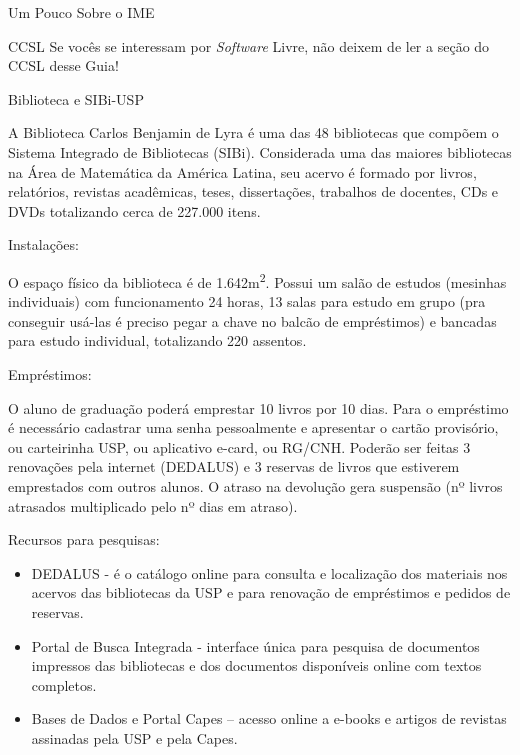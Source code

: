 \begin{secao}{Um Pouco Sobre o IME}
\begin{subsecao}{CCSL}
Se vocês se interessam por \textit{Software} Livre, não deixem de ler a seção
do CCSL desse Guia!

\end{subsecao}

\begin{subsecao}{Biblioteca e SIBi-USP}

A Biblioteca Carlos Benjamin de Lyra é uma das 48 bibliotecas que compõem o Sistema Integrado de Bibliotecas (SIBi). Considerada uma das maiores bibliotecas na Área de Matemática da América Latina, seu acervo é formado por livros, relatórios, revistas acadêmicas, teses, dissertações, trabalhos de docentes, CDs e DVDs totalizando cerca de 227.000 itens. 

\begin{subsubsecao}{Instalações:}

O espaço físico da biblioteca é de 1.642m\textsuperscript{2}. Possui um salão de estudos (mesinhas individuais) com funcionamento 24 horas, 13 salas para estudo em grupo (pra conseguir usá-las é preciso pegar a chave no balcão de empréstimos) e bancadas para estudo individual, totalizando 220 assentos.
\end{subsubsecao}

\begin{subsubsecao}{Empréstimos:}

O aluno de graduação poderá emprestar 10 livros por 10 dias. Para o empréstimo é necessário cadastrar uma senha pessoalmente e apresentar o cartão provisório, ou carteirinha USP, ou aplicativo e-card, ou RG/CNH. Poderão ser feitas 3 renovações pela internet (DEDALUS) e 3 reservas de livros que estiverem emprestados com outros alunos. O atraso na devolução gera suspensão (nº livros atrasados multiplicado pelo nº dias em atraso). 
\end{subsubsecao}

\begin{subsubsecao}{Recursos para pesquisas:}
\begin{itemize}
    \item DEDALUS - é o catálogo online para consulta e localização dos materiais nos acervos das bibliotecas da USP e para renovação de empréstimos e pedidos de reservas. 
    \item Portal de Busca Integrada - interface única para pesquisa de documentos impressos das bibliotecas e dos documentos disponíveis online com textos completos. 
    \item Bases de Dados e Portal Capes – acesso online a e-books e artigos de revistas assinadas pela USP e pela Capes.
    \end{itemize}
\end{subsubsecao}


\end{subsecao}
\end{secao}
